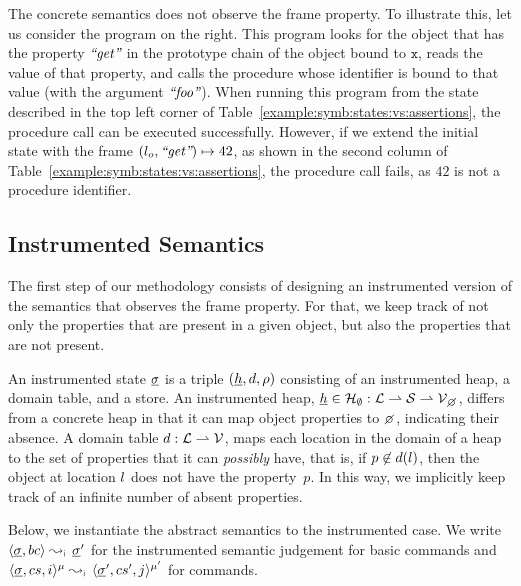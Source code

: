 The \jsil concrete semantics does not observe the frame property. To illustrate this,
let us consider the program on the right. 
This program looks for the object that has the property $\text{{\it ``get''}}$ in the 
prototype chain of the object bound to $\mathtt{x}$, reads the value of that 
property, and calls the procedure whose identifier is bound to that value 
(with the argument $\text{{\it ``foo''}}$). 
When running this program from the state described in the top left corner of 
Table~\ref{example:symb:states:vs:assertions}, the procedure call can be executed 
successfully. However, if we extend the initial state with the frame $(l_o, \text{{\it ``get''}}) \mapsto 42$, 
as shown in the second column of Table~\ref{example:symb:states:vs:assertions}, the procedure 
call fails, as $42$ is not a procedure identifier. 

\vspace*{-0.2cm}
\subsection{\jsil Instrumented Semantics}\label{subsec:instrumented}

The first step of our methodology %
consists of designing an instrumented version of the semantics that observes the frame property. 
%
For that, we keep track of not only the properties that are present in a given object, but also the properties that are not present.

An instrumented state $\underline{\sigma}$ is a triple $(\underline{h}, d, \rho)$ consisting of an instrumented heap, 
a domain table, and a store. 
%
An instrumented heap, $\iheap \in \iheaps : \locs \partialmap \strings \partialmap \setext{\vals}{\none}$, 
differs from a concrete heap in that it can map object properties to $\none$, indicating their absence. 
%
A domain table $d : {\mathcal L} \rightharpoonup \mathcal{V}$, maps each location in the domain of a heap to the set 
of properties that it can \emph{possibly} have, that is, if $p \not\in d(l)$, then the object 
at location $l$ does not have the property~$p$. In this way, we implicitly keep track of an infinite number of absent properties.
%

Below, we instantiate the \jsil abstract semantics to the instrumented case. 
We write $\absbsemrule{\istate, \bcmd}{\istate'}{\instrumented}$ for the instrumented semantic 
judgement for \jsil basic commands and $\abssemrule{\istate, \cs, i}{\istate', \cs', j}{\mode}{\mode'}{\instrumented}$ 
for \jsil commands. 

